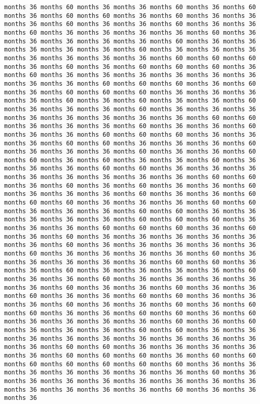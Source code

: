 \documentclass[11pt]{article}
\begin{document}
\begin{Verbatim}[commandchars=\\\{\}, frame=single, framerule=2mm, rulecolor=\color{outerrorbackground}]
months 36 months 60 months 36 months 36 months 60 months 36 months 60 months 36 months 60 months 60 months 36 months 60 months 36 months 36 months 36 months 60 months 36 months 36 months 60 months 36 months 36 months 60 months 36 months 36 months 36 months 36 months 60 months 36 months 36 months 36 months 36 months 36 months 60 months 36 months 36 months 36 months 36 months 36 months 60 months 36 months 36 months 36 months 36 months 36 months 36 months 36 months 60 months 60 months 60 months 36 months 60 months 36 months 60 months 60 months 60 months 36 months 60 months 36 months 36 months 36 months 36 months 36 months 36 months 36 months 36 months 60 months 60 months 60 months 36 months 60 months 36 months 60 months 60 months 60 months 36 months 36 months 36 months 36 months 60 months 36 months 60 months 36 months 36 months 60 months 36 months 36 months 36 months 60 months 36 months 36 months 36 months 36 months 36 months 36 months 36 months 36 months 60 months 60 months 36 months 36 months 36 months 60 months 36 months 36 months 60 months 36 months 36 months 60 months 60 months 60 months 36 months 36 months 36 months 60 months 60 months 36 months 36 months 36 months 60 months 36 months 36 months 36 months 60 months 36 months 36 months 60 months 60 months 36 months 60 months 36 months 36 months 60 months 36 months 36 months 36 months 60 months 60 months 36 months 36 months 36 months 36 months 36 months 36 months 36 months 36 months 60 months 60 months 36 months 60 months 36 months 60 months 36 months 36 months 60 months 36 months 36 months 36 months 60 months 36 months 36 months 60 months 60 months 60 months 36 months 36 months 36 months 60 months 60 months 36 months 36 months 36 months 60 months 60 months 36 months 36 months 36 months 36 months 36 months 60 months 60 months 60 months 36 months 36 months 36 months 60 months 60 months 60 months 36 months 60 months 36 months 60 months 36 months 36 months 36 months 36 months 36 months 36 months 60 months 36 months 36 months 36 months 36 months 36 months 60 months 36 months 36 months 36 months 36 months 60 months 36 months 36 months 36 months 36 months 36 months 60 months 60 months 36 months 36 months 60 months 36 months 36 months 36 months 36 months 60 months 36 months 36 months 60 months 36 months 36 months 36 months 36 months 36 months 60 months 36 months 36 months 60 months 36 months 36 months 60 months 36 months 36 months 60 months 60 months 36 months 36 months 36 months 60 months 36 months 36 months 60 months 36 months 60 months 60 months 36 months 36 months 60 months 60 months 36 months 60 months 36 months 36 months 36 months 36 months 60 months 36 months 60 months 36 months 36 months 36 months 60 months 60 months 36 months 36 months 36 months 36 months 36 months 36 months 36 months 36 months 36 months 36 months 60 months 60 months 36 months 36 months 36 months 36 months 36 months 60 months 60 months 60 months 36 months 60 months 60 months 60 months 60 months 60 months 60 months 60 months 36 months 36 months 36 months 36 months 36 months 36 months 36 months 60 months 36 months 36 months 36 months 36 months 36 months 36 months 36 months 36 months 36 months 36 months 36 months 36 months 60 months 36 months 36 months 36 
\end{Verbatim}
\end{document}
